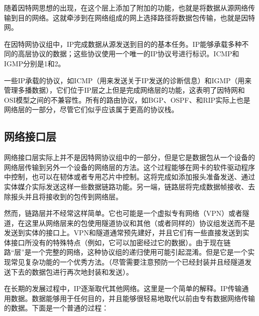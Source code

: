 随着因特网思想的出现，在这个层上添加了附加的功能，也就是将数据从源网络传输到目的网络。这就牵涉到在网络组成的网上选择路径将数据包传输，也就是因特网。

在因特网协议组中，IP完成数据从源发送到目的的基本任务。IP能够承载多种不同的高层协议的数据；这些协议使用一个唯一的IP协议号进行标识。ICMP和IGMP分别是1和2。

一些IP承载的协议，如ICMP（用来发送关于IP发送的诊断信息）和IGMP（用来管理多播数据），它们位于IP层之上但是完成网络层的功能，这表明了因特网和OSI模型之间的不兼容性。所有的路由协议，如BGP、OSPF、和RIP实际上也是网络层的一部分，尽管它们似乎应该属于更高的协议栈。






\subsection{网络接口层}



网络接口层实际上并不是因特网协议组中的一部分，但是它是数据包从一个设备的网络层传输到另外一个设备的网络层的方法。这个过程能够在网卡的软件驱动程序中控制，也可以在韧体或者专用芯片中控制。这将完成如添加报头准备发送、通过实体媒介实际发送这样一些数据链路功能。另一端，链路层将完成数据帧接收、去除报头并且将接收到的包传到网络层。

然而，链路层并不经常这样简单。它也可能是一个虚拟专有网络（VPN）或者隧道，在这里从网络层来的包使用隧道协议和其他（或者同样的）协议组发送而不是发送到实体的接口上。VPN和隧道通常预先建好，并且它们有一些直接发送到实体接口所没有的特殊特点（例如，它可以加密经过它的数据）。由于现在链路“层”是一个完整的网络，这种协议组的递归使用可能引起混淆。但是它是一个实现常见复杂功能的一个优秀方法。（尽管需要注意预防一个已经封装并且经隧道发送下去的数据包进行再次地封装和发送）。










在长期的发展过程中，IP逐渐取代其他网络。这里是一个简单的解释。IP传输通用数据。数据能够用于任何目的，并且能够很轻易地取代以前由专有数据网络传输的数据。下面是一个普通的过程：

